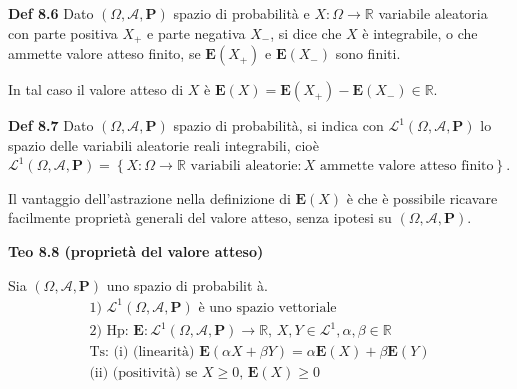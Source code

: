 \documentclass{article}
\begin{document}
\textbf{Def 8.6 }Dato $\left( \Omega ,\mathcal{A},\mathbf{P}\right) $ spazio
di probabilit\`{a} e $X:\Omega \rightarrow 
\mathbb{R}
$ variabile aleatoria con parte positiva $X_{+}$ e parte negativa $X_{-}$,
si dice che $X$ \`{e} integrabile, o che ammette valore atteso finito, se $%
\mathbf{E}\left( X_{+}\right) $ e $\mathbf{E}\left( X_{-}\right) $ sono
finiti.

In tal caso il valore atteso di $X$ \`{e} $\mathbf{E}\left( X\right) =%
\mathbf{E}\left( X_{+}\right) -\mathbf{E}\left( X_{-}\right) \in 
\mathbb{R}
$.

\textbf{Def 8.7} Dato $\left( \Omega ,\mathcal{A},\mathbf{P}\right) $ spazio
di probabilit\`{a}, si indica con $\mathcal{L}^{1}\left( \Omega ,\mathcal{A},%
\mathbf{P}\right) $ lo spazio delle variabili aleatorie reali integrabili,
cio\`{e} $\mathcal{L}^{1}\left( \Omega ,\mathcal{A},\mathbf{P}\right)
=\left\{ X:\Omega \rightarrow 
\mathbb{R}
\text{ variabili aleatorie}:X\text{ ammette valore atteso finito}\right\} $.

Il vantaggio dell'astrazione nella definizione di $\mathbf{E}\left( X\right) 
$ \`{e} che \`{e} possibile ricavare facilmente propriet\`{a} generali del
valore atteso, senza ipotesi su $\left( \Omega ,\mathcal{A},\mathbf{P}%
\right) $.

\textbf{Teo 8.8 (propriet\`{a} del valore atteso)}

Sia $\left( \Omega ,\mathcal{A},\mathbf{P}\right) $ uno spazio di probabilit%
\`{a}. 
\begin{gather*}
\text{1) }\mathcal{L}^{1}\left( \Omega ,\mathcal{A},\mathbf{P}\right) \text{ 
\`{e} uno spazio vettoriale} \\
\text{2) Hp: }\mathbf{E}:\mathcal{L}^{1}\left( \Omega ,\mathcal{A},\mathbf{P}%
\right) \rightarrow 
\mathbb{R}
\text{, }X,Y\in \mathcal{L}^{1},\alpha ,\beta \in 
\mathbb{R}
\\
\text{Ts: (i) (linearit\`{a}) }\mathbf{E}\left( \alpha X+\beta Y\right)
=\alpha \mathbf{E}\left( X\right) +\beta \mathbf{E}\left( Y\right) \\
\text{(ii) (positivit\`{a}) se }X\geq 0\text{, }\mathbf{E}\left( X\right)
\geq 0
\end{gather*}
\end{document}
